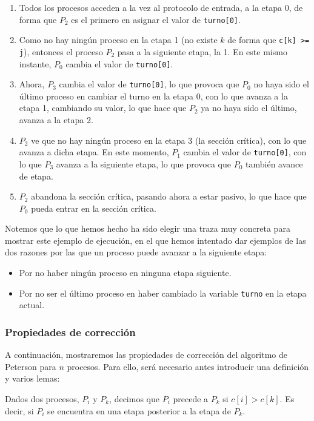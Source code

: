 \begin{ejemplo}
\begin{enumerate}[label=(\arabic*), start=0]
        \item Todos los procesos acceden a la vez al protocolo de entrada, a la etapa 0, de forma que $P_2$ es el primero en asignar el valor de \verb|turno[0]|.
        \item Como no hay ningún proceso en la etapa 1 (no existe $k$ de forma que \verb|c[k] >= j|), entonces el proceso $P_2$ pasa a la siguiente etapa, la 1. En este mismo instante, $P_0$ cambia el valor de \verb|turno[0]|.
        \item Ahora, $P_3$ cambia el valor de \verb|turno[0]|, lo que provoca que $P_0$ no haya sido el último proceso en cambiar el turno en la etapa 0, con lo que avanza a la etapa 1, cambiando su valor, lo que hace que $P_2$ ya no haya sido el último, avanza a la etapa 2.
        \item $P_2$ ve que no hay ningún proceso en la etapa 3 (la sección crítica), con lo que avanza a dicha etapa. En este momento, $P_1$ cambia el valor de \verb|turno[0]|, con lo que $P_3$ avanza a la siguiente etapa, lo que provoca que $P_0$ también avance de etapa.
        \item $P_2$ abandona la sección crítica, pasando ahora a estar pasivo, lo que hace que $P_0$ pueda entrar en la sección crítica.
    \end{enumerate}
    Notemos que lo que hemos hecho ha sido elegir una traza muy concreta para mostrar este ejemplo de ejecución, en el que hemos intentado dar ejemplos de las dos razones por las que un proceso puede avanzar a la siguiente etapa:
    \begin{itemize}
        \item Por no haber ningún proceso en ninguna etapa siguiente.
        \item Por no ser el último proceso en haber cambiado la variable \verb|turno| en la etapa actual.
    \end{itemize}
\end{ejemplo}

\subsubsection{Propiedades de corrección}
A continuación, mostraremos las propiedades de corrección del algoritmo de Peterson para $n$ procesos. Para ello, será necesario antes introducir una definición y varios lemas:

\begin{definicion}[Precedencia]
    Dados dos procesos, $P_i$ y $P_k$, decimos que $P_i$ precede a $P_k$ si $c[i] > c[k]$. Es decir, si $P_i$ se encuentra en una etapa posterior a la etapa de $P_k$.
\end{definicion}

